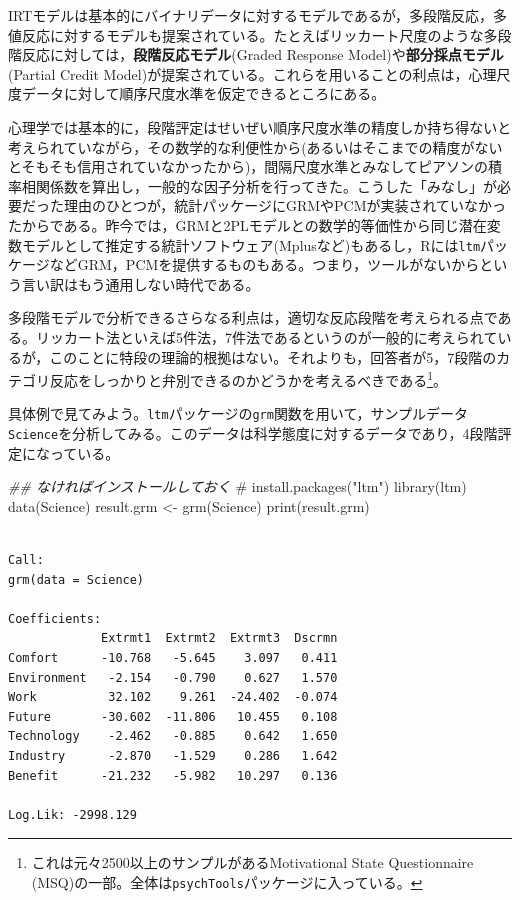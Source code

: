 \documentclass[
  a4paper,
]{ltjsbook}
\newenvironment{Shaded}{\begin{snugshade}}{\end{snugshade}}
\newcommand{\CommentTok}[1]{\textcolor[rgb]{0.37,0.37,0.37}{#1}}
\newcommand{\DocumentationTok}[1]{\textcolor[rgb]{0.37,0.37,0.37}{\textit{#1}}}
\newcommand{\FunctionTok}[1]{\textcolor[rgb]{0.28,0.35,0.67}{#1}}
\newcommand{\NormalTok}[1]{\textcolor[rgb]{0.00,0.23,0.31}{#1}}
\newcommand{\OtherTok}[1]{\textcolor[rgb]{0.00,0.23,0.31}{#1}}
\begin{document}
IRTモデルは基本的にバイナリデータに対するモデルであるが，多段階反応，多値反応に対するモデルも提案されている。たとえばリッカート尺度のような多段階反応に対しては，\textbf{段階反応モデル}(Graded
Response Model)や\textbf{部分採点モデル}(Partial Credit
Model)が提案されている。これらを用いることの利点は，心理尺度データに対して順序尺度水準を仮定できるところにある。

心理学では基本的に，段階評定はせいぜい順序尺度水準の精度しか持ち得ないと考えられていながら，その数学的な利便性から(あるいはそこまでの精度がないとそもそも信用されていなかったから)，間隔尺度水準とみなしてピアソンの積率相関係数を算出し，一般的な因子分析を行ってきた。こうした「みなし」が必要だった理由のひとつが，統計パッケージにGRMやPCMが実装されていなかったからである。昨今では，GRMと2PLモデルとの数学的等価性から同じ潜在変数モデルとして推定する統計ソフトウェア(Mplusなど)もあるし，Rには\texttt{ltm}パッケージなどGRM，PCMを提供するものもある。つまり，ツールがないからという言い訳はもう通用しない時代である。

多段階モデルで分析できるさらなる利点は，適切な反応段階を考えられる点である。リッカート法といえば5件法，7件法であるというのが一般的に考えられているが，このことに特段の理論的根拠はない。それよりも，回答者が5，7段階のカテゴリ反応をしっかりと弁別できるのかどうかを考えるべきである\footnote{これは元々2500以上のサンプルがあるMotivational
  State Questionnaire
  (MSQ)の一部。全体は\texttt{psychTools}パッケージに入っている。}。

具体例で見てみよう。\texttt{ltm}パッケージの\texttt{grm}関数を用いて，サンプルデータ\texttt{Science}を分析してみる。このデータは科学態度に対するデータであり，4段階評定になっている。

\begin{Shaded}
\begin{Highlighting}[]
\DocumentationTok{\#\# なければインストールしておく}
\CommentTok{\# install.packages("ltm")}
\FunctionTok{library}\NormalTok{(ltm)}
\FunctionTok{data}\NormalTok{(Science)}
\NormalTok{result.grm }\OtherTok{\textless{}{-}} \FunctionTok{grm}\NormalTok{(Science)}
\FunctionTok{print}\NormalTok{(result.grm)}
\end{Highlighting}
\end{Shaded}

\begin{verbatim}

Call:
grm(data = Science)

Coefficients:
             Extrmt1  Extrmt2  Extrmt3  Dscrmn
Comfort      -10.768   -5.645    3.097   0.411
Environment   -2.154   -0.790    0.627   1.570
Work          32.102    9.261  -24.402  -0.074
Future       -30.602  -11.806   10.455   0.108
Technology    -2.462   -0.885    0.642   1.650
Industry      -2.870   -1.529    0.286   1.642
Benefit      -21.232   -5.982   10.297   0.136

Log.Lik: -2998.129
\end{verbatim}
\end{document}
